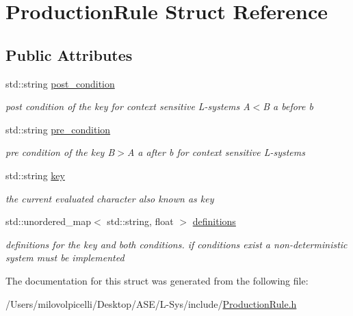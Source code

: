 \hypertarget{struct_production_rule}{}\section{Production\+Rule Struct Reference}
\label{struct_production_rule}
\subsection*{Public Attributes}
\begin{DoxyCompactItemize}
\item 
\mbox{\label{struct_production_rule_aa0cfa840823490434199c5c5765c5bd9}} 
std\+::string \hyperlink{struct_production_rule_aa0cfa840823490434199c5c5765c5bd9}{post\+\_\+condition}
\begin{DoxyCompactList}\small\item\em post condition of the key for context sensitive L-\/systems A$<$B a before b \end{DoxyCompactList}\item 
\mbox{\label{struct_production_rule_ab0648c49cf3f13966393d7af317e96dd}} 
std\+::string \hyperlink{struct_production_rule_ab0648c49cf3f13966393d7af317e96dd}{pre\+\_\+condition}
\begin{DoxyCompactList}\small\item\em pre condition of the key B$>$A a after b for context sensitive L-\/systems \end{DoxyCompactList}\item 
\mbox{\label{struct_production_rule_a48c26db89821c74cd294241f2bd92d12}} 
std\+::string \hyperlink{struct_production_rule_a48c26db89821c74cd294241f2bd92d12}{key}
\begin{DoxyCompactList}\small\item\em the current evaluated character also known as key \end{DoxyCompactList}\item 
\mbox{\label{struct_production_rule_a87edea9cf18748e84603ebf672ba40a6}} 
std\+::unordered\+\_\+map$<$ std\+::string, float $>$ \hyperlink{struct_production_rule_a87edea9cf18748e84603ebf672ba40a6}{definitions}
\begin{DoxyCompactList}\small\item\em definitions for the key and both conditions. if conditions exist a non-\/deterministic system must be implemented \end{DoxyCompactList}\end{DoxyCompactItemize}


The documentation for this struct was generated from the following file\+:\begin{DoxyCompactItemize}
\item 
/\+Users/milovolpicelli/\+Desktop/\+A\+S\+E/\+L-\/\+Sys/include/\hyperlink{_production_rule_8h}{Production\+Rule.\+h}\end{DoxyCompactItemize}
